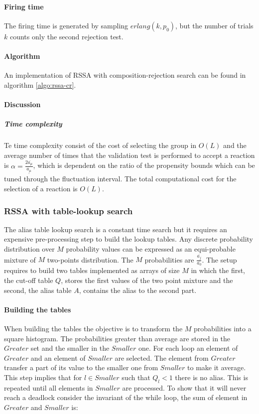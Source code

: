       \paragraph{Firing time}
      The firing time is generated by sampling $erlang(k,p_0)$, but the number of trials $k$ counts only the second rejection test.

      \paragraph{Algorithm}
      An implementation of RSSA with composition-rejection search can be found in algorithm \ref{algo:rssa-cr}.

      

      \paragraph{Discussion}

        \subparagraph{Time complexity}
        Te time complexity consist of the cost of selecting the group in $O(L)$ and the average number of times that the validation test is performed to accept a reaction is $\alpha = \frac{2\overline{a_\mu}}{\underline{a_\mu}}$, which is dependent on the ratio of the propensity bounds which can be tuned through the fluctuation interval.
        The total computational cost for the selection of a reaction is $O(L)$.

    \subsubsection{RSSA with table-lookup search}
    The alias table lookup search is a constant time search but it requires an expensive pre-processing step to build the lookup tables.
    Any discrete probability distribution over $M$ probability values can be expressed as an equi-probable mixture of $M$ two-points distribution.
    The $M$ probabilities are $\frac{\overline{a_j}}{\overline{a_0}}$.
    The setup requires to build two tables implemented as arrays of size $M$ in which the first, the cut-off table $Q$, stores the first values of the two point mixture and the second, the alias table $A$, contains the alias to the second part.

      \paragraph{Building the tables}
      When building the tables the objective is to transform the $M$ probabilities into a square histogram.
      The probabilities greater than average are stored in the $Greater$ set and the smaller in the $Smaller$ one.
      For each loop an element of $Greater$ and an element of $Smaller$ are selected.
      The element from $Greater$ transfer a part of its value to the smaller one from $Smaller$ to make it average.
      This step implies that for $l\in Smaller$ such that $Q_l<1$ there is no alias.
      This is repeated until all elements in $Smaller$ are processed.
      To show that it will never reach a deadlock consider the invariant of the while loop, the sum of element in $Greater$ and $Smaller$ is:

